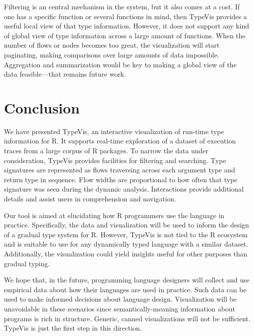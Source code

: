\documentclass{vgtc}                          %
\begin{document}
Filtering is an central mechanism in the system,
but it also comes at a cost.
If one has a specific function or several functions
in mind, then {\sc TypeVis} provides a useful
local view of that type information.
However, it does not support any kind of global
view of type information across a large amount of
functions. When the number of flows or nodes
becomes too great, the visualization will start
paginating, making comparisons over large amounts
of data impossible.
Aggregation and summarization would be key to
making a global view of the data feasible---that
remains future work.


\section{Conclusion}

We have presented {\sc TypeVis}, an interactive visualization
of run-time type information for R.
It supports real-time exploration of a dataset of
execution traces from a large corpus of R packages.
To narrow the data under consideration,
{\sc TypeVis} provides facilities for filtering
and searching.
Type signatures are represented as flows traversing across
each argument type and return type in sequence.
Flow widths are proportional to how often
that type signature was seen during the dynamic analysis.
Interactions provide additional details and
assist users in comprehension and navigation.

Our tool is aimed at elucidating how R programmers
use the language in practice.
Specifically, the data and visualization will be used to
inform the design of a gradual type system for R.
However, {\sc TypeVis} is not tied to the R ecosystem
and is suitable to use for any dynamically typed language
with a similar dataset.
Additionally, the visualization could yield insights
useful for other purposes than gradual typing.

We hope that, in the future, programming language designers
will collect and use empirical data about how their languages
are used in practice.
Such data can be used to make informed decisions about
language design.
Visualization will be unavoidable in these scenarios
since semantically-meaning information about programs
is rich in structure.
Generic, canned visualizations will not be sufficient.
{\sc TypeVis} is just the first step in this direction.





\end{document}
